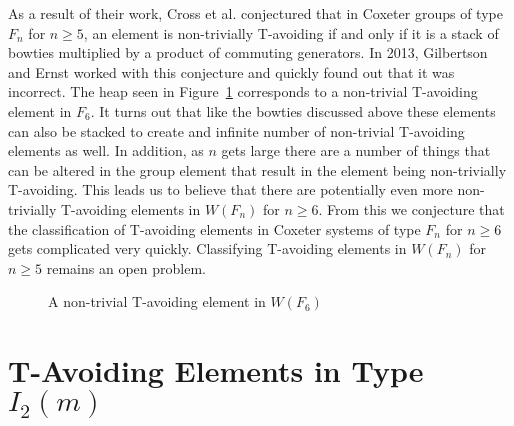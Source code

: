 As a result of their work, Cross et al. conjectured that in Coxeter groups of type $F_n$ for $n \geq 5$, an element is non-trivially T-avoiding if and only if it is a stack of bowties multiplied by a product of commuting generators. In 2013, Gilbertson and Ernst worked with this conjecture and quickly found out that it was incorrect. The heap seen in Figure~\ref{fig:f6bat} corresponds to a non-trivial T-avoiding element in $F_6$. It turns out that like the bowties discussed above these elements can also be stacked to create and infinite number of non-trivial T-avoiding elements as well. In addition, as $n$ gets large there are a number of things that can be altered in the group element that result in the element being non-trivially T-avoiding. This leads us to believe that there are potentially even more non-trivially T-avoiding elements in $W(F_n)$ for $n \geq 6$. From this we conjecture that the classification of T-avoiding elements in Coxeter systems of type $F_n$ for $n \geq 6$ gets complicated very quickly. Classifying T-avoiding elements in $W(F_n)$ for $n \geq 5$ remains an open problem. 

\begin{figure}[h!]\centering
{}
\caption{A non-trivial T-avoiding element in $W(F_6)$}\label{fig:f6bat}
\end{figure}


\section{T-Avoiding Elements in Type $I_2(m)$}

